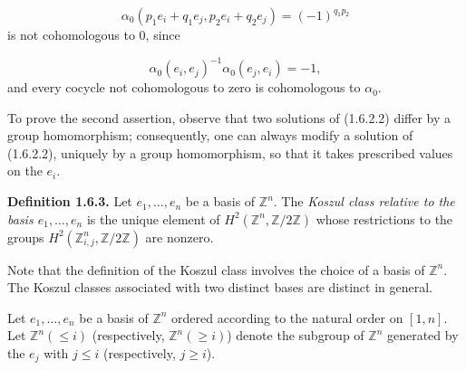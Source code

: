 \begin{equation*}
  \alpha_0(p_1e_i+q_1e_j,p_2e_i+q_2e_j)=(-1)^{q_1p_2}
\end{equation*}
is not cohomologous to $0$, since

\begin{equation*}
  \alpha_0(e_i,e_j)^{-1}\alpha_0(e_j,e_i)=-1,
\end{equation*}
and every cocycle not cohomologous to zero is cohomologous to
$\alpha_0$.

To prove the second assertion, observe that two solutions of (1.6.2.2)
differ by a group homomorphism; consequently, one can always modify a
solution of (1.6.2.2), uniquely by a group homomorphism, so that it
takes prescribed values on the $e_i$.

\noindent\textbf{Definition 1.6.3.}\quad
Let $e_1,\ldots,e_n$ be a basis of $\mathbb Z^n$. The
\emph{Koszul class relative to the basis $e_1,\ldots,e_n$} is the
unique element of $H^2(\mathbb Z^n,\mathbb Z/2\mathbb Z)$ whose
restrictions to the groups
$H^2(\mathbb Z^n_{i,j},\mathbb Z/2\mathbb Z)$ are nonzero.

Note that the definition of the Koszul class involves the choice of a
basis of $\mathbb Z^n$. The Koszul classes associated with two distinct
bases are distinct in general.

Let $e_1,\ldots,e_n$ be a basis of $\mathbb Z^n$ ordered according to
the natural order on $[1,n]$. Let $\mathbb Z^n(\leq i)$ (respectively,
$\mathbb Z^n(\geq i)$) denote the subgroup of $\mathbb Z^n$ generated
by the $e_j$ with $j\leq i$ (respectively, $j\geq i$).
